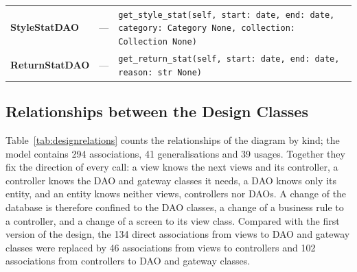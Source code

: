 {\begin{xltabular}{\textwidth}{@{}L{3.5cm} L{3.4cm} Y@{}}
\textbf{StyleStatDAO} & --- & \texttt{get\_\allowbreak{}style\_\allowbreak{}stat(self,\allowbreak{} start: date,\allowbreak{} end: date,\allowbreak{} category: Category \textbar{} None,\allowbreak{} collection: Collection \textbar{} None)} \\
\textbf{ReturnStatDAO} & --- & \texttt{get\_\allowbreak{}return\_\allowbreak{}stat(self,\allowbreak{} start: date,\allowbreak{} end: date,\allowbreak{} reason: str \textbar{} None)} \\
\end{xltabular}
}

\subsection{Relationships between the Design Classes}
\label{subsec:designrelations}
Table~\ref{tab:designrelations} counts the relationships of the diagram by kind; the model contains 294 associations, 41 generalisations and 39 usages. Together they fix the direction of every call: a view knows the next views and its controller, a controller knows the DAO and gateway classes it needs, a DAO knows only its entity, and an entity knows neither views, controllers nor DAOs. A change of the database is therefore confined to the DAO classes, a change of a business rule to a controller, and a change of a screen to its view class. Compared with the first version of the design, the 134 direct associations from views to DAO and gateway classes were replaced by 46 associations from views to controllers and 102 associations from controllers to DAO and gateway classes.

